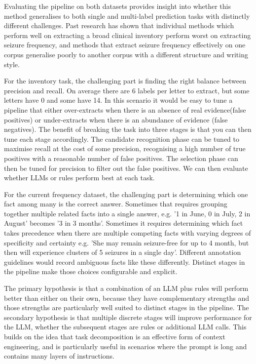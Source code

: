 \documentclass[conference]{IEEEtran}
\begin{document}
Evaluating the pipeline on both datasets provides insight
into whether this method generalises to both single and 
multi-label prediction tasks with distinctly different challenges. 
Past research has shown that individual methods which perform 
well on extracting a broad clinical inventory perform worst on
extracting seizure frequency, and methods that extract seizure
frequency effectively on one corpus generalise poorly to 
another corpus with a different structure and writing style.

For the inventory task, the challenging part is finding the 
right balance between precision and recall. On average there are 
6 labels per letter to extract, but some letters have 0 and some have 14. In this 
scenario it would be easy to tune a pipeline that either 
over-extracts when there  is an absence of real 
evidence(false positives) or under-extracts when there is 
an abundance of evidence (false negatives). The benefit of 
breaking the task into three stages is that you can then tune 
each stage accordingly. The candidate recognition phase can 
be tuned to maximise recall at the cost of some precision, 
recognising a high number of true positives with a reasonable 
number of false positives. The selection phase can then be
tuned for precision to filter out the false positives. We can
then evaluate whether LLMs or rules perform best at each 
task.

For the current frequency dataset, the challenging part is 
determining which one fact among many is the correct 
answer. Sometimes that requires grouping together 
multiple related facts into a single answer, e.g. '1 in
June, 0 in July, 2 in August' becomes '3 in 3 months'. 
Sometimes it requires determining which fact takes 
precedence when there are multiple competing facts with 
varying degrees of specificity and certainty e.g. 'She may 
remain seizure-free for up to 4 month, but then will 
experience clusters of 5 seizures in a single day'. Different 
annotation guidelines would record ambiguous facts like 
these differently. Distinct stages in the pipeline make 
those choices configurable and explicit.

The primary hypothesis is that a combination of an LLM
plus rules will perform better than either on their own, 
because they have complementary strengths and those 
strengths are particularly well suited to distinct stages in
the pipeline. The secondary hypothesis is that multiple 
discrete stages will improve performance for the LLM,
whether the subsequent stages are rules or additional
LLM calls. This builds on the idea that task decomposition
is an effective form of context engineering, and is 
particularly useful in scenarios where the prompt is long
and contains many layers of instructions. 
\end{document}
